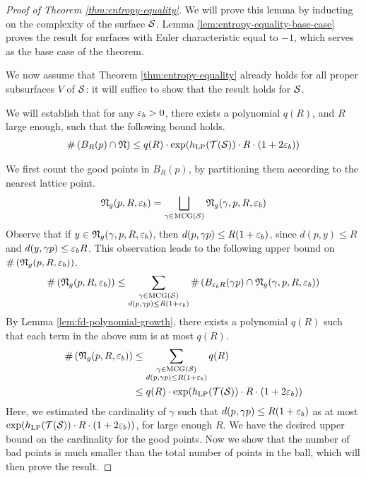 \begin{proof}[Proof of Theorem \ref{thm:entropy-equality}]
  We will prove this lemma by inducting on the complexity of the surface $\mathcal{S}$.
  Lemma \ref{lem:entropy-equality-base-case} proves the result for surfaces with Euler characteristic equal to $-1$, which serves as the base case of the theorem.

  We now assume that Theorem \ref{thm:entropy-equality} already holds for all proper subsurfaces $V$ of $\mathcal{S}$: it will suffice to show that the result holds for $\mathcal{S}$.

  We will establish that for any $\varepsilon_b > 0$, there exists a polynomial $q(R)$, and $R$ large enough, such that the following bound holds.
  \begin{align*}
    \#\left( B_R(p) \cap \mathfrak{N} \right) \leq q(R) \cdot \exp(h_{\mathrm{LP}}(\mathcal{T}(\mathcal{S})) \cdot R \cdot (1 + 2 \varepsilon_b))
  \end{align*}

  We first count the good points in $B_R(p)$, by partitioning them according to the nearest lattice point.
  \begin{align}
    \label{eq:good-point-partition}
    \mathfrak{N}_g(p, R, \varepsilon_b) = \bigsqcup_{\gamma \in \mathrm{MCG}(\mathcal{S})} \mathfrak{N}_g(\gamma, p, R, \varepsilon_b)
  \end{align}
  Observe that if $y \in \mathfrak{N}_g(\gamma, p, R, \varepsilon_b)$, then $d(p, \gamma p) \leq R(1 + \varepsilon_b)$, since $d(p, y) \leq R$ and $d(y, \gamma p) \leq \varepsilon_b R$.
  This observation leads to the following upper bound on $\#\left( \mathfrak{N}_g(p, R, \varepsilon_b) \right)$.
  \begin{align}
    \#\left( \mathfrak{N}_g(p, R, \varepsilon_b) \right) \leq \sum_{\substack{\gamma \in \mathrm{MCG}(\mathcal{S}) \\ d(p, \gamma p) \leq R(1 + \varepsilon_b)}} \#\left( B_{\varepsilon_b R}(\gamma p) \cap \mathfrak{N}_g(\gamma, p, R, \varepsilon_b)  \right) \label{eq:good-estimate-1}
  \end{align}
  By Lemma \ref{lem:fd-polynomial-growth}, there exists a polynomial $q(R)$ such that each term in the above sum is at most $q(R)$.
  \begin{align}
    \#\left( \mathfrak{N}_g(p, R, \varepsilon_b) \right) &\leq \sum_{\substack{\gamma \in \mathrm{MCG}(\mathcal{S}) \\ d(p, \gamma p) \leq R(1 + \varepsilon_b)}} q(R) \\
     &\leq q(R) \cdot \exp(h_{\mathrm{LP}}(\mathcal{T}(\mathcal{S})) \cdot R \cdot (1 + 2 \varepsilon_b))
    \label{eq:good-estimate-2}
  \end{align}
  Here, we estimated the cardinality of $\gamma$ such that $d(p, \gamma p) \leq R(1+\varepsilon_b)$ as at most $\exp(h_{\mathrm{LP}}(\mathcal{T}(\mathcal{S})) \cdot R \cdot (1 + 2 \varepsilon_b))$, for large enough $R$.
  We have the desired upper bound on the cardinality for the good points.
  Now we show that the number of bad points is much smaller than the total number of points in the ball, which will then prove the result.


\end{proof}
